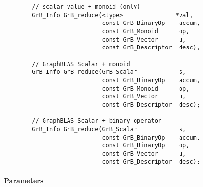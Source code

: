 \begin{verbatim}
        // scalar value + monoid (only)
        GrB_Info GrB_reduce(<type>               *val,
                            const GrB_BinaryOp    accum,
                            const GrB_Monoid      op,
                            const GrB_Vector      u,
                            const GrB_Descriptor  desc);

        // GraphBLAS Scalar + monoid
        GrB_Info GrB_reduce(GrB_Scalar            s,
                            const GrB_BinaryOp    accum,
                            const GrB_Monoid      op,
                            const GrB_Vector      u,
                            const GrB_Descriptor  desc);

        // GraphBLAS Scalar + binary operator
        GrB_Info GrB_reduce(GrB_Scalar            s,
                            const GrB_BinaryOp    accum,
                            const GrB_BinaryOp    op,
                            const GrB_Vector      u,
                            const GrB_Descriptor  desc);
\end{verbatim}

\paragraph{Parameters}

